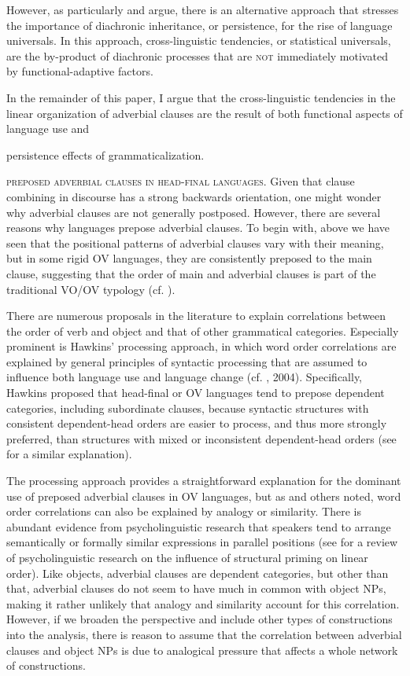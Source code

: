 \documentclass[output=paper]{langsci/langscibook}
\begin{document}
However, as particularly  and  argue, there is an alternative approach that stresses the importance of diachronic inheritance, or persistence, for the rise of language universals. In this approach, cross-linguistic tendencies, or statistical universals, are the by-product of diachronic processes that are \textsc{not} immediately motivated by functional-adaptive factors. 

In the remainder of this paper, I argue that the cross-linguistic tendencies in the linear organization of adverbial clauses are the result of both functional aspects of language use and 

persistence effects of grammaticalization. 

\textsc{preposed} \textsc{adverbial} \textsc{clauses} \textsc{in} \textsc{head-final} \textsc{languages}. Given that clause combining in discourse has a strong backwards orientation, one might wonder why adverbial clauses are not generally postposed. However, there are several reasons why languages prepose adverbial clauses. To begin with, above we have seen that the positional patterns of adverbial clauses vary with their meaning, but in some rigid OV languages, they are consistently preposed to the main clause, suggesting that the order of main and adverbial clauses is part of the traditional VO/OV typology (cf. \citealt{Diessel2001}).

There are numerous proposals in the literature to explain correlations between the order of verb and object and that of other grammatical categories. Especially prominent is Hawkins’ processing approach, in which word order correlations are explained by general principles of syntactic processing that are assumed to influence both language use and language change (cf. \citealt{Hawkins1994}, 2004). Specifically, Hawkins proposed that head-final or OV languages tend to prepose dependent categories, including subordinate clauses, because syntactic structures with consistent dependent-head orders are easier to process, and thus more strongly preferred, than structures with mixed or inconsistent dependent-head orders (see \citealt{Dryer1992} for a similar explanation).

The processing approach provides a straightforward explanation for the dominant use of preposed adverbial clauses in OV languages, but as \citet{Krifka1985} and others noted, word order correlations can also be explained by analogy or similarity. There is abundant evidence from psycholinguistic research that speakers tend to arrange semantically or formally similar expressions in parallel positions (see \citealt{PickeringFerreira2008} for a review of psycholinguistic research on the influence of structural priming on linear order). Like objects, adverbial clauses are dependent categories, but other than that, adverbial clauses do not seem to have much in common with object NPs, making it rather unlikely that analogy and similarity account for this correlation. However, if we broaden the perspective and include other types of constructions into the analysis, there is reason to assume that the correlation between adverbial clauses and object NPs is due to analogical pressure that affects a whole network of constructions.
\end{document}
